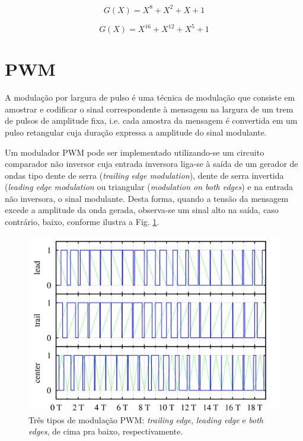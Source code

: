 \begin{equation}
\label{CRC_1}
G(X) = X^8 + X^2 + X + 1 
\end{equation}

\begin{equation}
\label{CRC_2}
G(X) = X^{16} + X^{12} + X^5 + 1 
\end{equation}

\section{PWM}
A modulação por largura de pulso é uma técnica de modulação que consiste em amostrar e codificar o sinal correspondente à mensagem na largura de um 
trem de pulsos de amplitude fixa, i.e. cada amostra da mensagem é convertida em um pulso retangular cuja duração expressa a amplitude do sinal 
modulante.

Um modulador PWM pode ser implementado utilizando-se um circuito comparador não inversor cuja entrada inversora liga-se à saída de um gerador de 
ondas tipo dente de serra (\textit{trailing edge modulation}), dente de serra invertida (\textit{leading edge modulation}  ou triangular 
(\textit{modulation on both edges}) e na entrada não inversora, o sinal modulante. 
Desta forma, quando a tensão da mensagem excede a amplitude da onda gerada, observa-se um sinal alto na saída, caso contrário, baixo, conforme 
ilustra a Fig. \ref{pwm_modulation_types}.

  \begin{figure}[H] %
    \centering
    \includegraphics[width=0.7\linewidth]{../../Imagens/PWM_modulation_types.png}
    \caption{Três tipos de modulação PWM: \textit{trailing edge}, \textit{leading edge} e  \textit{both edges}, de cima pra baixo, respectivamente.}
    \label{pwm_modulation_types}
  \end{figure}
  
